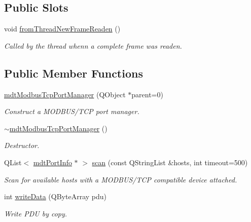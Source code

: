 \subsection*{Public Slots}
\begin{DoxyCompactItemize}
\item 
void \hyperlink{classmdt_modbus_tcp_port_manager_ad941ea607f00db54aa6deb2866a539e9}{fromThreadNewFrameReaden} ()
\begin{DoxyCompactList}\small\item\em Called by the thread whenn a complete frame was readen. \end{DoxyCompactList}\end{DoxyCompactItemize}
\subsection*{Public Member Functions}
\begin{DoxyCompactItemize}
\item 
\hyperlink{classmdt_modbus_tcp_port_manager_a2f65f779bbad19d9d3f85ef35220ffb8}{mdtModbusTcpPortManager} (QObject $\ast$parent=0)
\begin{DoxyCompactList}\small\item\em Construct a MODBUS/TCP port manager. \end{DoxyCompactList}\item 
\hyperlink{classmdt_modbus_tcp_port_manager_aabe51a50a53c6b23884cc4862730b731}{$\sim$mdtModbusTcpPortManager} ()
\begin{DoxyCompactList}\small\item\em Destructor. \end{DoxyCompactList}\item 
QList$<$ \hyperlink{classmdt_port_info}{mdtPortInfo} $\ast$ $>$ \hyperlink{classmdt_modbus_tcp_port_manager_a216ee2495440be4eefb2faf9da3c9e47}{scan} (const QStringList \&hosts, int timeout=500)
\begin{DoxyCompactList}\small\item\em Scan for available hosts with a MODBUS/TCP compatible device attached. \end{DoxyCompactList}\item 
int \hyperlink{classmdt_modbus_tcp_port_manager_a0c56b7d38cfb52d95e81de4ca6ac414f}{writeData} (QByteArray pdu)
\begin{DoxyCompactList}\small\item\em Write PDU by copy. \end{DoxyCompactList}\end{DoxyCompactItemize}


